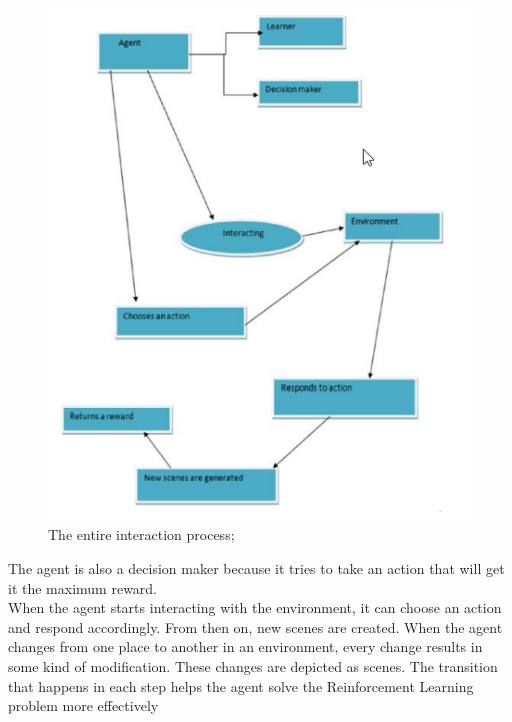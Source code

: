 \documentclass[12pt,a4paper]{article}
\begin{document}
\begin{figure}[hbt!]
\begin{center}
\includegraphics[scale=0.74]{The entire interaction process}
\caption{The entire interaction process; }%
\end{center}
\end{figure}
The agent is also a decision maker because it tries to take an action that will get it the 
maximum reward.\\
When the agent starts interacting with the environment, it can choose an action and 
respond accordingly.
From then on, new scenes are created. When the agent changes from one place to 
another in an environment, every change results in some kind of modification. These 
changes are depicted as scenes. The transition that happens in each step helps the agent 
solve the Reinforcement Learning problem more effectively\\
\end{document}
